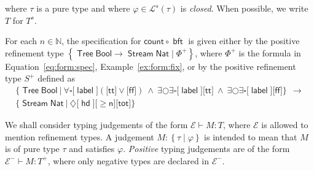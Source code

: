 \documentclass[%
  a4paper,
  UKenglish,
  cleveref,
  autoref,
  thm-restate,
  numberwithinsect,
]{lipics-v2021}
\newcommand\longto\longrightarrow
\newcommand\thesis{\vdash}
\newcommand\NN{\mathbb{N}}
\newcommand\comp{\mathbin\circ}
\newcommand\Next{\mathord{\bigcirc}}
\renewcommand{\Box}{\square}
\newcommand{\Diam}{\diamondsuit}
\newcommand\Env{\mathcal{E}}    %
\newcommand\term[1]{\mathsf{#1}}
\newcommand\type[1]{\term{#1}}
\newcommand\hd{\mathop{\term{hd}}}
\newcommand\lbl{\mathop{\term{label}}}
\newcommand\cnt{\term{count}}
\newcommand\bft{\mathop{\term{bft}}}
\newcommand\arrow\to
\newcommand\longarrow\longto
\newcommand\Bool{\type{Bool}}
\newcommand\Nat{\type{Nat}}
\newcommand\Stream{\mathop{\type{Stream}}}
\newcommand\Tree{\mathop{\type{Tree}}}
\newcommand\true{\term{tt}}
\newcommand\false{\term{ff}}
\newcommand\reft[1]{\left\{ #1 \right\}}
\newcommand\PT{\tau}		%
\newcommand\RT{T}               %
\newcommand\tot{\term{tot}}
\newcommand\Lang{\mathcal{L}}
\newcommand\form[1]{\lbrack #1 \rbrack}
\newcommand\sign{s}
\begin{document}
\noindent
where $\PT$ is a pure type and where
$\varphi \in \Lang^\sign(\PT)$ is \emph{closed}.
When possible, we write $\RT$ for $\RT^\sign$.


\begin{example}
\label{ex:reft:spec}
For each $n \in \NN$,
the specification for $\cnt \comp \bft$
is given either by the positive 
refinement type
$\reft{\Tree\Bool \arrow \Stream\Nat \mid \Phi^+}$,
where $\Phi^+$ is the formula in Equation~\eqref{eq:form:spec},
Example~\ref{ex:form:fix},
or by the positive refinement type
$S^+$ defined as
\begin{multline*}
  \big\{ \Tree\Bool ~\big|~
  \forall\Box\form\lbl(\form\true \lor \form\false)
  ~\land~
  \exists\Next\exists\Box\form\lbl\form\true
  ~\land~
  \exists\Next\exists\Box\form\lbl\form\false \big\}
  ~~\longarrow
\\
  \big\{ \Stream\Nat ~\big|~ \Diam\form\hd \form{\geq \term n} \form\tot \big\}
\end{multline*}
\lipicsEnd
\end{example}


We shall consider typing judgements of the form
$\Env \thesis M \colon \RT$,
where $\Env$ is allowed to mention refinement types.
A judgement
$M \colon \reft{\PT \mid \varphi}$
is intended to mean that $M$ is of pure type $\PT$ and satisfies $\varphi$.
\emph{Positive} typing judgements are of the
form $\Env^- \thesis M \colon \RT^+$,
where only negative types are declared in $\Env^-$.
\end{document}
